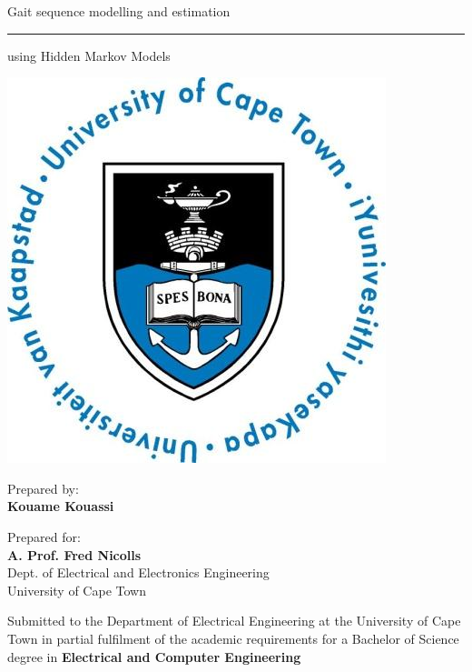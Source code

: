 \documentclass[a4paper,12pt]{report}
\begin{document}
 
\thispagestyle{empty}
{\Huge \begin{center}
Gait sequence modelling and estimation
\hrule 
{\Large using Hidden Markov Models}
\end{center}}

\vskip 5mm
\begin{center}
\- \- \- \- \- \- \- \- \- \-\includegraphics[scale = 0.3]{uctLogo.png}
\end{center}

\vskip 5mm
\begin{center}
Prepared by:\\
\textbf{Kouame Kouassi}		%
\end{center}

\vskip 10mm
\begin{center}
Prepared for:\\
\textbf{A. Prof. Fred Nicolls}\\ 		%
Dept. of Electrical and Electronics Engineering\\University of Cape Town
\end{center}


\vskip 10mm
\begin{center}
Submitted to the Department of Electrical Engineering at the University of Cape Town in partial
fulfilment of the academic requirements for a Bachelor of Science degree in \textbf{Electrical and Computer Engineering}
\end{center}
\end{document}
